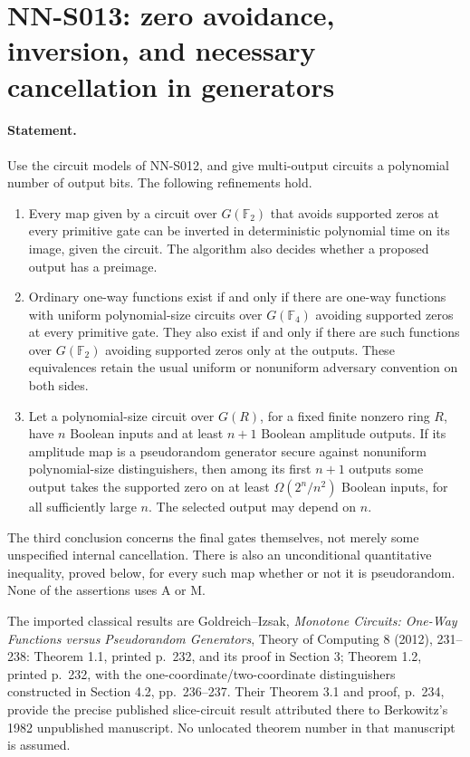 \section{NN-S013: zero avoidance, inversion, and necessary cancellation in generators}

\paragraph{Statement.}
Use the circuit models of NN-S012, and give multi-output circuits a
polynomial number of output bits. The following refinements hold.
\begin{enumerate}
\item Every map given by a circuit over $G(\mathbb F_2)$ that avoids
      supported zeros at every primitive gate can be inverted in
      deterministic polynomial time on its image, given the circuit.
      The algorithm also decides whether a proposed output has a preimage.
\item Ordinary one-way functions exist if and only if there are one-way
      functions with uniform polynomial-size circuits over
      $G(\mathbb F_4)$ avoiding supported zeros at every primitive gate.
      They also exist if and only if there are such functions over
      $G(\mathbb F_2)$ avoiding supported zeros only at the outputs.
      These equivalences retain the usual uniform or nonuniform
      adversary convention on both sides.
\item Let a polynomial-size circuit over $G(R)$, for a fixed finite
      nonzero ring $R$, have $n$ Boolean inputs and at least $n+1$ Boolean amplitude
      outputs. If its amplitude map is a pseudorandom generator secure
      against nonuniform polynomial-size distinguishers, then among
      its first $n+1$ outputs some output takes the supported zero on
      at least $\Omega(2^n/n^2)$ Boolean inputs, for all sufficiently
      large $n$. The selected output may depend on $n$.
\end{enumerate}
The third conclusion concerns the final gates themselves, not merely
some unspecified internal cancellation. There is also an unconditional
quantitative inequality, proved below, for every such map whether or
not it is pseudorandom. None of the assertions uses A or M.

The imported classical results are Goldreich--Izsak,
\emph{Monotone Circuits: One-Way Functions versus Pseudorandom
Generators}, Theory of Computing 8 (2012), 231--238:
Theorem 1.1, printed p.~232, and its proof in Section 3;
Theorem 1.2, printed p.~232, with the one-coordinate/two-coordinate
distinguishers constructed in Section 4.2, pp.~236--237.
Their Theorem 3.1 and proof, p.~234, provide the precise published
slice-circuit result attributed there to Berkowitz's 1982 unpublished
manuscript. No unlocated theorem number in that manuscript is assumed.

